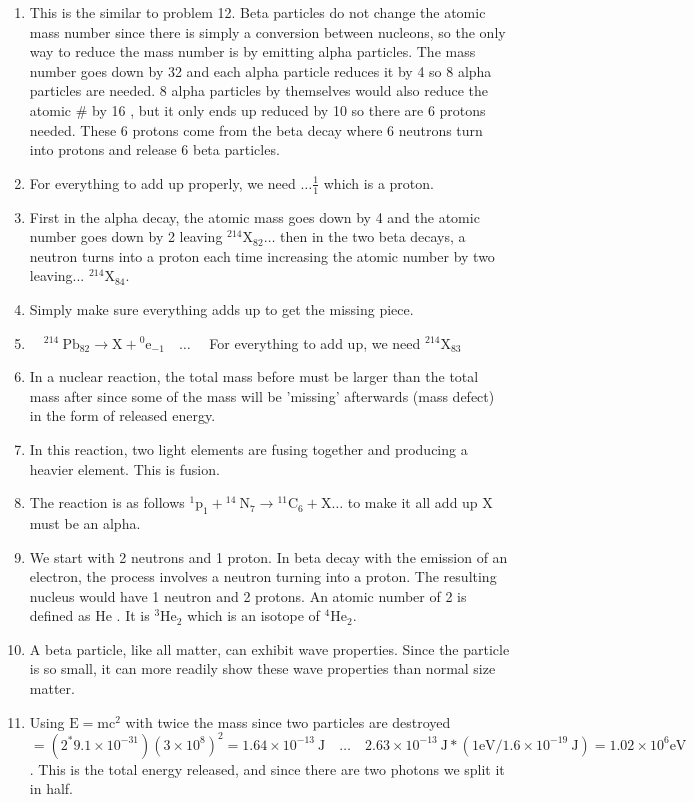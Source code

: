 \begin{enumerate}
\begin{enumerate}
  \item This is the similar to problem 12. Beta particles do not change the atomic mass number since there is simply a conversion between nucleons, so the only way to reduce the mass number is by emitting alpha particles. The mass number goes down by 32 and each alpha particle reduces it by 4 so 8 alpha particles are needed. 8 alpha particles by themselves would also reduce the atomic $\#$ by 16 , but it only ends up reduced by 10 so there are 6 protons needed. These 6 protons come from the beta decay where 6 neutrons turn into protons and release 6 beta particles.
  \item For everything to add up properly, we need $\ldots \frac{1}{1}$ which is a proton.
  \item First in the alpha decay, the atomic mass goes down by 4 and the atomic number goes down by 2 leaving ${ }^{214} \mathrm{X}_{82} \ldots$ then in the two beta decays, a neutron turns into a proton each time increasing the atomic number by two leaving... ${ }^{214} \mathrm{X}_{84}$.
  \item Simply make sure everything adds up to get the missing piece.
  \item $\quad{ }^{214} \mathrm{~Pb}_{82} \rightarrow \mathrm{X}+{ }^{0} \mathrm{e}_{-1} \quad \ldots \quad$ For everything to add up, we need ${ }^{214} \mathrm{X}_{83}$
  \item In a nuclear reaction, the total mass before must be larger than the total mass after since some of the mass will be 'missing' afterwards (mass defect) in the form of released energy.
  \item In this reaction, two light elements are fusing together and producing a heavier element. This is fusion.
  \item The reaction is as follows ${ }^{1} \mathrm{p}_{1}+{ }^{14} \mathrm{~N}_{7} \rightarrow{ }^{11} \mathrm{C}_{6}+\mathrm{X} \ldots$ to make it all add up X must be an alpha.
  \item We start with 2 neutrons and 1 proton. In beta decay with the emission of an electron, the process involves a neutron turning into a proton. The resulting nucleus would have 1 neutron and 2 protons. An atomic number of 2 is defined as He . It is ${ }^{3} \mathrm{He}_{2}$ which is an isotope of ${ }^{4} \mathrm{He}_{2}$.
  \item A beta particle, like all matter, can exhibit wave properties. Since the particle is so small, it can more readily show these wave properties than normal size matter.
  \item Using $\mathrm{E}=\mathrm{mc}^{2}$ with twice the mass since two particles are destroyed $=\left(2^{*} 9.1 \times 10^{-31}\right)\left(3 \times 10^{8}\right)^{2}=1.64 \times 10^{-13} \mathrm{~J} \quad \ldots \quad 2.63 \times 10^{-13} \mathrm{~J} *\left(1 \mathrm{eV} / 1.6 \times 10^{-19} \mathrm{~J}\right)=1.02 \times 10^{6} \mathrm{eV}$. This is the total energy released, and since there are two photons we split it in half.

\end{enumerate}
\end{enumerate}

